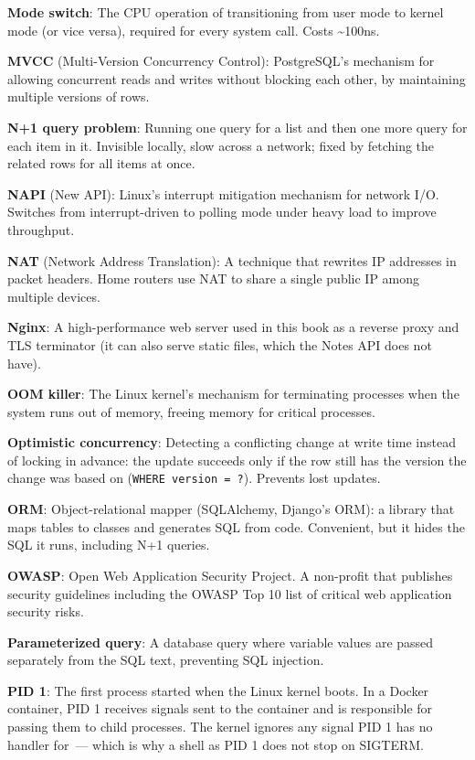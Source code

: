 \textbf{Mode switch}: The CPU operation of transitioning from user mode to kernel mode (or vice versa), required for every system call. Costs \textasciitilde100ns.

\textbf{MVCC} (Multi-Version Concurrency Control): PostgreSQL's mechanism for allowing concurrent reads and writes without blocking each other, by maintaining multiple versions of rows.

\textbf{N+1 query problem}: Running one query for a list and then one more query for each item in it. Invisible locally, slow across a network; fixed by fetching the related rows for all items at once.

\textbf{NAPI} (New API): Linux's interrupt mitigation mechanism for network I/O. Switches from interrupt-driven to polling mode under heavy load to improve throughput.

\textbf{NAT} (Network Address Translation): A technique that rewrites IP addresses in packet headers. Home routers use NAT to share a single public IP among multiple devices.

\textbf{Nginx}: A high-performance web server used in this book as a reverse proxy and TLS terminator (it can also serve static files, which the Notes API does not have).

\textbf{OOM killer}: The Linux kernel's mechanism for terminating processes when the system runs out of memory, freeing memory for critical processes.

\textbf{Optimistic concurrency}: Detecting a conflicting change at write time instead of locking in advance: the update succeeds only if the row still has the version the change was based on (\texttt{WHERE\ version\ =\ ?}). Prevents lost updates.

\textbf{ORM}: Object-relational mapper (SQLAlchemy, Django's ORM): a library that maps tables to classes and generates SQL from code. Convenient, but it hides the SQL it runs, including N+1 queries.

\textbf{OWASP}: Open Web Application Security Project. A non-profit that publishes security guidelines including the OWASP Top 10 list of critical web application security risks.

\textbf{Parameterized query}: A database query where variable values are passed separately from the SQL text, preventing SQL injection.

\textbf{PID 1}: The first process started when the Linux kernel boots. In a Docker container, PID 1 receives signals sent to the container and is responsible for passing them to child processes. The kernel ignores any signal PID 1 has no handler for~--- which is why a shell as PID 1 does not stop on SIGTERM.

